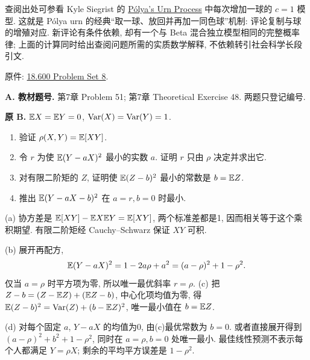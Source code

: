 \begin{solution}
查阅出处可参看 Kyle Siegrist 的 \href{https://www.randomservices.org/random/urn/Polya.html}{Pólya's Urn Process} 中每次增加一球的 $c=1$ 模型. 这就是 Pólya urn 的经典“取一球、放回并再加一同色球”机制: 评论复制与球的增殖对应. 新评论有条件依赖, 却有一个与 Beta 混合独立模型相同的完整概率律; 上面的计算同时给出查阅问题所需的实质数学解释, 不依赖转引社会科学长段引文.
\end{solution}

原件: \href{https://ocw.mit.edu/courses/18-600-probability-and-random-variables-fall-2019/resources/mit18_600f19_pset8/}{18.600 Problem Set 8}.
\par\noindent\textbf{A. 教材题号.}\label{part:P8.A.1} 第7章 Problem 51; \label{part:P8.A.2} 第7章 Theoretical Exercise 48. 两题只登记编号.

\begin{exercise}\label{ex:P8.B}
\textbf{原 B.} $\mathbb E X=\mathbb E Y=0$, $\operatorname{Var}(X)=\operatorname{Var}(Y)=1$.
\begin{enumerate}[label=(\alph*)]
\item\label{part:P8.B.a} 验证 $\rho(X,Y)=\mathbb E[XY]$.
\item\label{part:P8.B.b} 令 $r$ 为使 $\mathbb E(Y-aX)^2$ 最小的实数 $a$. 证明 $r$ 只由 $\rho$ 决定并求出它.
\item\label{part:P8.B.c} 对有限二阶矩的 $Z$, 证明使 $\mathbb E(Z-b)^2$ 最小的常数是 $b=\mathbb E Z$.
\item\label{part:P8.B.d} 推出 $\mathbb E(Y-aX-b)^2$ 在 $a=r,b=0$ 时最小.
\end{enumerate}
\end{exercise}
\begin{solution}\label{sol:P8.B}
(a) 协方差是 $\mathbb E[XY]-\mathbb E X\mathbb E Y=\mathbb E[XY]$, 两个标准差都是1, 因而相关等于这个乘积期望. 有限二阶矩经 Cauchy--Schwarz 保证 $XY$ 可积.

(b) 展开再配方,
\[
 \mathbb E(Y-aX)^2=1-2a\rho+a^2=(a-\rho)^2+1-\rho^2.
\]
仅当 $a=\rho$ 时平方项为零, 所以唯一最优斜率 $r=\rho$. (c) 把 $Z-b=(Z-\mathbb E Z)+(\mathbb E Z-b)$, 中心化项均值为零, 得 $\mathbb E(Z-b)^2=\operatorname{Var}(Z)+(b-\mathbb E Z)^2$, 唯一最小值在 $b=\mathbb E Z$.

(d) 对每个固定 $a$, $Y-aX$ 的均值为0, 由(c)最优常数为 $b=0$. 或者直接展开得到 $(a-\rho)^2+b^2+1-\rho^2$, 同时在 $a=\rho,b=0$ 处唯一最小. 最佳线性预测不表示每个人都满足 $Y=\rho X$; 剩余的平均平方误差是 $1-\rho^2$.
\end{solution}

